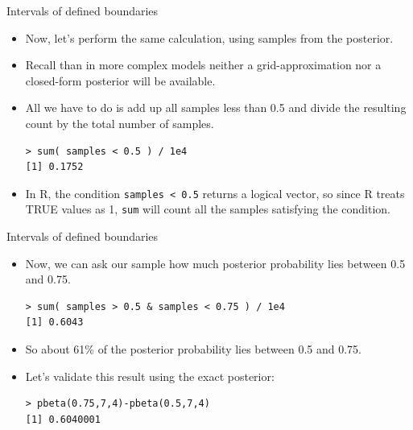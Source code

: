 \documentclass[handout]{beamer}
\begin{document}
\begin{frame}[fragile]{Intervals of defined boundaries}
\scriptsize{
\begin{itemize}

\item Now, let's perform the same calculation, using samples from the posterior.

\item Recall than in more complex models neither a grid-approximation nor a closed-form posterior will be available.

\item All we have to do is add up all samples less than 0.5 and divide the resulting count by the total number of samples.

\begin{verbatim}
> sum( samples < 0.5 ) / 1e4
[1] 0.1752 
\end{verbatim}


\item In R, the condition \verb+samples < 0.5+ returns a logical vector, so since R treats TRUE values as 1, \verb+sum+ will count all the samples satisfying the condition.

\end{itemize}



} 

\end{frame}


\begin{frame}[fragile]{Intervals of defined boundaries}
\scriptsize{
\begin{itemize}

\item Now, we can ask our sample how much posterior probability lies between 0.5 and 0.75.

\begin{verbatim}
> sum( samples > 0.5 & samples < 0.75 ) / 1e4
[1] 0.6043
\end{verbatim}

\item So about 61\% of the posterior probability lies between 0.5 and 0.75.

\item Let's validate this result using the exact posterior:

\begin{verbatim}
> pbeta(0.75,7,4)-pbeta(0.5,7,4)
[1] 0.6040001
\end{verbatim}

\end{itemize}



} 

\end{frame}
\end{document}
